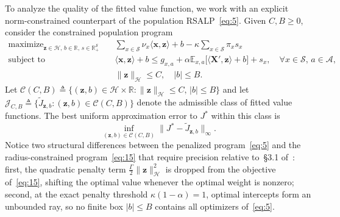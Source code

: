 \documentclass[11pt,letterpaper]{article}
\newcommand{\E}{\mathbb{E}}
\newcommand{\R}{\mathbb{R}}
\newcommand{\Jclass}{\mathcal{J}_{C,B}}
\newcommand{\ip}[2]{\langle #1, #2\rangle}
\newcommand{\norm}[1]{\lVert #1\rVert}
\newcommand{\defeq}{\triangleq}
\theoremstyle{definition}
\begin{document}
To analyze the quality of the fitted value function, we work with an explicit norm-constrained counterpart of the population RSALP~\eqref{eq:5}. Given $C,B \ge 0$, consider the constrained population program
\begin{equation}
\begin{aligned}
 \text{maximize}_{\mathbf{z}\in\mathcal{H},\, b\in\R,\, s\in\R_+^{\mathcal{S}}}\quad &
   \sum_{x\in\mathcal{S}} \nu_x \ip{\mathbf{x}}{\mathbf{z}} + b - \kappa \sum_{x\in\mathcal{S}} \pi_x s_x \\
 \text{subject to}\quad &
   \ip{\mathbf{x}}{\mathbf{z}} + b \le g_{x,a} + \alpha \E_{x,a}\bigl[\ip{\mathbf{X}'}{\mathbf{z}} + b\bigr] + s_x,
   \quad \forall x\in\mathcal{S},\, a\in\mathcal{A},\\
 & \norm{\mathbf{z}}_{\mathcal{H}} \le C, \quad |b| \le B.
\end{aligned}
\tag{15}\label{eq:15}
\end{equation}
Let $\mathcal{C}(C,B) \defeq \{(\mathbf{z},b)\in\mathcal{H}\times\R : \norm{\mathbf{z}}_{\mathcal{H}} \le C,\, |b| \le B\}$ and let $\Jclass \defeq \{\tilde{J}_{\mathbf{z},b} : (\mathbf{z},b)\in\mathcal{C}(C,B)\}$ denote the admissible class of fitted value functions. The best uniform approximation error to $J^*$ within this class is
\begin{equation}
 \inf_{(\mathbf{z},b)\in\mathcal{C}(C,B)} \norm{J^* - \tilde{J}_{\mathbf{z},b}}_\infty.
 \tag{16}\label{eq:16}
\end{equation}
Notice two structural differences between the penalized program~\eqref{eq:5} and the radius-constrained program~\eqref{eq:15} that require precision relative to~\S3.1 of~\cite{BFMZ22}: first, the quadratic penalty term $\frac{\Gamma}{2}\norm{\mathbf{z}}_{\mathcal{H}}^2$ is dropped from the objective of~\eqref{eq:15}, shifting the optimal value whenever the optimal weight is nonzero; second, at the exact penalty threshold $\kappa(1-\alpha) = 1$, optimal intercepts form an unbounded ray, so no finite box $|b|\le B$ contains all optimizers of~\eqref{eq:5}.
\end{document}
